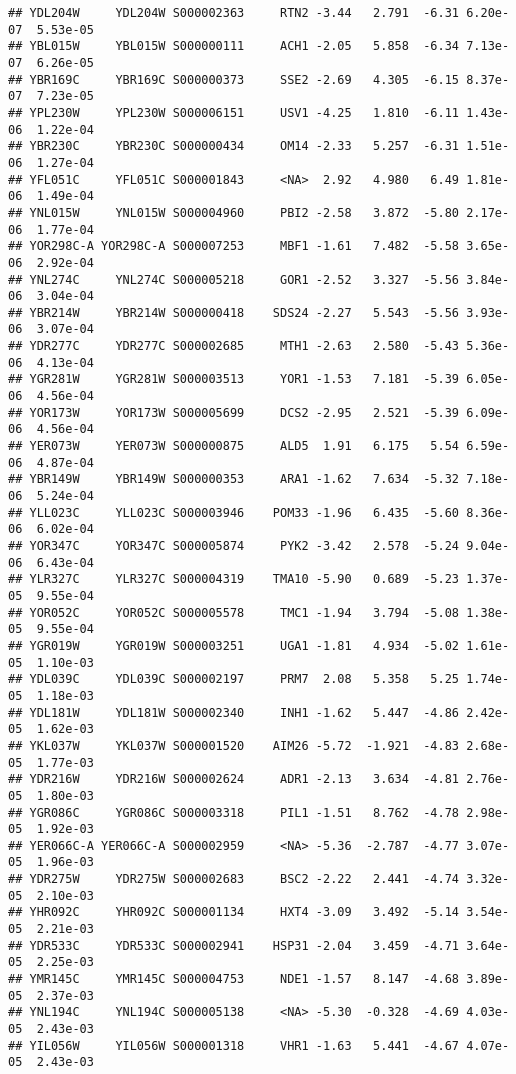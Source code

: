 \documentclass[
]{book}
\begin{document}
\begin{verbatim}
## YDL204W     YDL204W S000002363     RTN2 -3.44   2.791  -6.31 6.20e-07  5.53e-05
## YBL015W     YBL015W S000000111     ACH1 -2.05   5.858  -6.34 7.13e-07  6.26e-05
## YBR169C     YBR169C S000000373     SSE2 -2.69   4.305  -6.15 8.37e-07  7.23e-05
## YPL230W     YPL230W S000006151     USV1 -4.25   1.810  -6.11 1.43e-06  1.22e-04
## YBR230C     YBR230C S000000434     OM14 -2.33   5.257  -6.31 1.51e-06  1.27e-04
## YFL051C     YFL051C S000001843     <NA>  2.92   4.980   6.49 1.81e-06  1.49e-04
## YNL015W     YNL015W S000004960     PBI2 -2.58   3.872  -5.80 2.17e-06  1.77e-04
## YOR298C-A YOR298C-A S000007253     MBF1 -1.61   7.482  -5.58 3.65e-06  2.92e-04
## YNL274C     YNL274C S000005218     GOR1 -2.52   3.327  -5.56 3.84e-06  3.04e-04
## YBR214W     YBR214W S000000418    SDS24 -2.27   5.543  -5.56 3.93e-06  3.07e-04
## YDR277C     YDR277C S000002685     MTH1 -2.63   2.580  -5.43 5.36e-06  4.13e-04
## YGR281W     YGR281W S000003513     YOR1 -1.53   7.181  -5.39 6.05e-06  4.56e-04
## YOR173W     YOR173W S000005699     DCS2 -2.95   2.521  -5.39 6.09e-06  4.56e-04
## YER073W     YER073W S000000875     ALD5  1.91   6.175   5.54 6.59e-06  4.87e-04
## YBR149W     YBR149W S000000353     ARA1 -1.62   7.634  -5.32 7.18e-06  5.24e-04
## YLL023C     YLL023C S000003946    POM33 -1.96   6.435  -5.60 8.36e-06  6.02e-04
## YOR347C     YOR347C S000005874     PYK2 -3.42   2.578  -5.24 9.04e-06  6.43e-04
## YLR327C     YLR327C S000004319    TMA10 -5.90   0.689  -5.23 1.37e-05  9.55e-04
## YOR052C     YOR052C S000005578     TMC1 -1.94   3.794  -5.08 1.38e-05  9.55e-04
## YGR019W     YGR019W S000003251     UGA1 -1.81   4.934  -5.02 1.61e-05  1.10e-03
## YDL039C     YDL039C S000002197     PRM7  2.08   5.358   5.25 1.74e-05  1.18e-03
## YDL181W     YDL181W S000002340     INH1 -1.62   5.447  -4.86 2.42e-05  1.62e-03
## YKL037W     YKL037W S000001520    AIM26 -5.72  -1.921  -4.83 2.68e-05  1.77e-03
## YDR216W     YDR216W S000002624     ADR1 -2.13   3.634  -4.81 2.76e-05  1.80e-03
## YGR086C     YGR086C S000003318     PIL1 -1.51   8.762  -4.78 2.98e-05  1.92e-03
## YER066C-A YER066C-A S000002959     <NA> -5.36  -2.787  -4.77 3.07e-05  1.96e-03
## YDR275W     YDR275W S000002683     BSC2 -2.22   2.441  -4.74 3.32e-05  2.10e-03
## YHR092C     YHR092C S000001134     HXT4 -3.09   3.492  -5.14 3.54e-05  2.21e-03
## YDR533C     YDR533C S000002941    HSP31 -2.04   3.459  -4.71 3.64e-05  2.25e-03
## YMR145C     YMR145C S000004753     NDE1 -1.57   8.147  -4.68 3.89e-05  2.37e-03
## YNL194C     YNL194C S000005138     <NA> -5.30  -0.328  -4.69 4.03e-05  2.43e-03
## YIL056W     YIL056W S000001318     VHR1 -1.63   5.441  -4.67 4.07e-05  2.43e-03

\end{verbatim}
\end{document}
